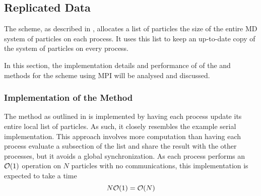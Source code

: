 \subsection{Replicated Data}

The \replicateddata{} scheme, as described in
,
allocates a list of particles the size of
the entire MD system of particles
on each process.
%
It uses this list to keep an up-to-date copy of the system of particles
on every process.

In this section, the implementation details and performance of
of the \individualoperation{} and \pairoperation{} methods
for the \replicateddata{} scheme using MPI will be analysed and discussed.


%
%

\subsubsection{Implementation of the \individualoperation{} Method}

The \individualoperation{} method as outlined in
is implemented by having each process update
its entire local list of particles.
%
As such, it closely resembles the example serial implementation.
%
This approach involves more computation than having each process
evaluate a subsection of the list and share the result with the
other processes, but it avoids a global synchronization.
%
As each process performs an $\mathcal{O}{\left({ 1 }\right)}$ operation on $N$ particles with
no communications,
this implementation is expected to take a time
\begin{equation}
\label{eqn:v0_replicated_individual_operation_overall_time}
    N\mathcal{O}{\left({ 1 }\right)} = \mathcal{O}{\left({ N }\right)}
\end  {equation}

\begin{figure}[!h]
    
    \caption{}
    \label{fig:v0_replicated_individual_operation_512_time}
\end  {figure}

\begin{figure}[!h]
    
    \caption{}
    \label{fig:v0_replicated_individual_operation_4096_time}
\end  {figure}

